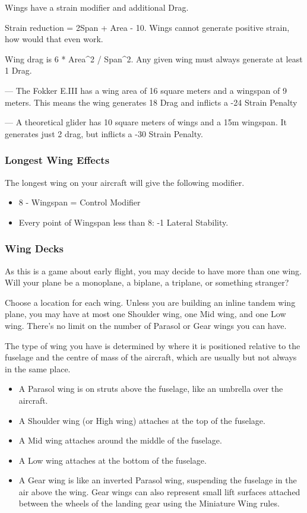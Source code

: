 \documentclass{article}
\begin{document}
Wings have a strain modifier and additional Drag.

Strain reduction = 2Span + Area - 10. Wings cannot generate positive
strain, how would that even work.

Wing drag is 6 * Area\^{}2 / Span\^{}2. Any given wing must always
generate at least 1 Drag.

--- The Fokker E.III has a wing area of 16 square
meters and a wingspan of 9 meters. This means the wing generates
18 Drag and inflicts a -24 Strain Penalty

--- A theoretical glider has 10 square meters of wings and a
15m wingspan. It generates just 2 drag,
but inflicts a -30 Strain Penalty.

\subsubsection{Longest Wing Effects}
\label{_Longest Wing Effects}

The longest wing on your aircraft will give the following modifier.

\begin{itemize}
  \item          8 - Wingspan = Control Modifier
  \item          Every point of Wingspan less than 8: -1 Lateral Stability.
\end{itemize}

\subsubsection{Wing Decks}
\label{_Wing Decks}

As this is a game about early flight, you may decide to have more than
one wing. Will your plane be a monoplane, a biplane, a triplane, or
something stranger?

Choose a location for each wing. Unless you are building an inline
tandem wing plane, you may have at most one Shoulder wing, one Mid wing,
and one Low wing. There's no limit on the number of Parasol or Gear
wings you can have.

The type of wing you have is determined by where it is positioned
relative to the fuselage and the centre of mass of the aircraft, which
are usually but not always in the same place.

\begin{itemize}
  \item          A Parasol wing is on struts above the fuselage, like an
        umbrella over the aircraft.
  \item          A Shoulder wing (or High wing) attaches at the top of the
        fuselage.
  \item          A Mid wing attaches around the middle of the fuselage.
  \item          A Low wing attaches at the bottom of the fuselage.
  \item          A Gear wing is like an inverted Parasol wing, suspending the
        fuselage in the air above the wing. Gear wings can also represent
        small lift surfaces attached between the wheels of the landing gear
        using the Miniature Wing rules.
\end{itemize}
\end{document}
